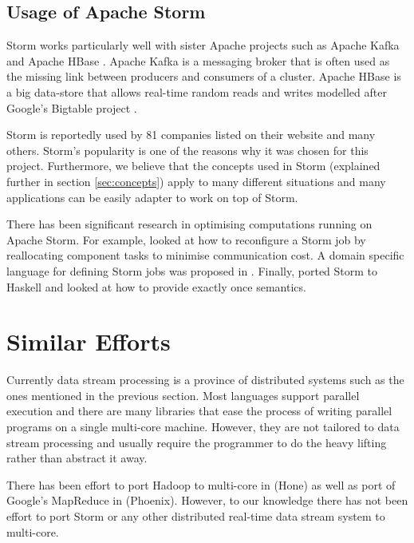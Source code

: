 \documentclass[bsc,logo,frontabs,twoside,singlespacing,normalheadings,parskip]{infthesis}\usepackage[]{graphicx}\usepackage[]{color}
\begin{document}
\subsection{Usage of Apache Storm}

Storm works particularly well with sister Apache projects such as Apache Kafka \cite{ApacheKafka} and Apache HBase \cite{ApacheHBase}. Apache Kafka is a messaging broker that is often used as the missing link between producers and consumers of a cluster. Apache HBase is a big data-store that allows real-time random reads and writes modelled after Google's Bigtable project \cite{Chang:2008:BDS:1365815.1365816}.

Storm is reportedly used by 81 companies listed on their website \cite{PoweredBy} and many others. Storm's popularity is one of the reasons why it was chosen for this project. Furthermore, we believe that the concepts used in Storm (explained further in section \ref{sec:concepts}) apply to many different situations and many applications can be easily adapter to work on top of Storm.

There has been significant research in optimising computations running on Apache Storm. For example, \cite{Chatzistergiou:2014:FHN:2661829.2661882} looked at how to reconfigure a Storm job by reallocating component tasks to minimise communication cost. A domain specific language for defining Storm jobs was proposed in \cite{DBLP:conf/fedcsis/ChandrasekaranSA14}. Finally, \cite{dimsonhailstorm} ported Storm to Haskell and looked at how to provide exactly once semantics.

\section{Similar Efforts}
\label{sec:similar_efforts}

Currently data stream processing is a province of distributed systems such as the ones mentioned in the previous section. Most languages support parallel execution and there are many libraries that ease the process of writing parallel programs on a single multi-core machine. However, they are not tailored to data stream processing and usually require the programmer to do the heavy lifting rather than abstract it away.

There has been effort to port Hadoop to multi-core in \citep{Kumar:2013:HSD:2536274.2536314} (Hone) as well as port of Google's MapReduce in \citep{ranger2007evaluating} (Phoenix). However, to our knowledge there has not been effort to port Storm or any other distributed real-time data stream system to multi-core.
\end{document}
